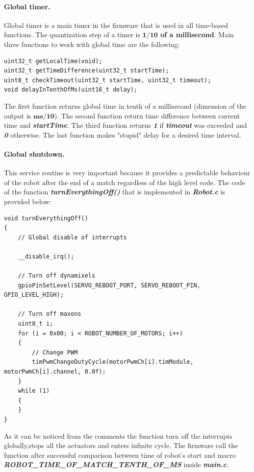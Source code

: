 \documentclass[a4paper,12pt]{article} %
\begin{document}
\paragraph{Global timer.}
Global timer is a main timer in the firmware that is used in all time-based functions. The quantization step of a timer is \textbf{$\textbf{1/10}$ of a millisecond}. Main three functions to work with global time are the following:
\begin{lstlisting}
uint32_t getLocalTime(void);
uint32_t getTimeDifference(uint32_t startTime);
uint8_t checkTimeout(uint32_t startTime, uint32_t timeout);
void delayInTenthOfMs(uint16_t delay);
\end{lstlisting}
The first function returns global time in tenth of a millisecond (dimension of the output is $\textbf{ms/10}$). The second function return time difference between current time and \textbf{\textit{startTime}}. The third function returns \textbf{\textit{1}} if \textbf{\textit{timeout}} was exceeded and \textbf{\textit{0}} otherwise. The last function makes "stupid" delay for a desired time interval.
 
\paragraph{Global shutdown.}
This service routine is very important because it provides a predictable behaviour of the robot after the end of a match regardless of the high level code. The code of the function \textbf{\textit{turnEverythingOff()}} that is implemented in \textbf{\textit{Robot.c}} is provided below:
\begin{lstlisting}
void turnEverythingOff()
{
	// Global disable of interrupts
	
	__disable_irq();

	// Turn off dynamixels
	gpioPinSetLevel(SERVO_REBOOT_PORT, SERVO_REBOOT_PIN, 				          GPIO_LEVEL_HIGH);
	
	// Turn off maxons
	uint8_t i;
	for (i = 0x00; i < ROBOT_NUMBER_OF_MOTORS; i++)
	{
		// Change PWM
		timPwmChangeDutyCycle(motorPwmCh[i].timModule, motorPwmCh[i].channel, 0.0f);
	}
	while (1)
	{
	}
} 

\end{lstlisting}
As it can be noticed from the comments the function  turn off the interrupts globally,stops all the actuators and enters infinite cycle. The firmware call the function after successful comparison between time of robot's start and macro \textbf{\textit{ROBOT\_TIME\_OF\_MATCH\_TENTH\_OF\_MS}} inside \textbf{\textit{main.c}}.
\end{document}
